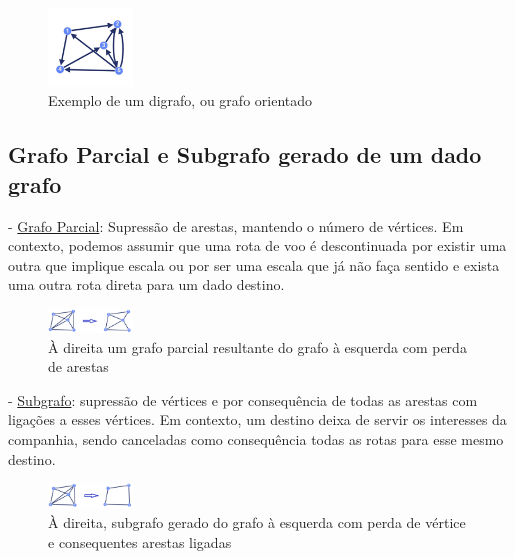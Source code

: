 \begin{figure}[h]
    \centering
    \includegraphics[width=0.2\textwidth]{imgs/Figura5}
    \caption{Exemplo de um digrafo, ou grafo orientado\label{fig:imagem5}}
\end{figure}

\subsection{Grafo Parcial e Subgrafo gerado de um dado grafo}
- \underline{Grafo Parcial}: Supressão de arestas, mantendo o número de vértices. Em contexto, podemos assumir 
que uma rota de voo é descontinuada por existir uma outra que implique escala ou por ser uma escala que já 
não faça sentido e exista uma outra rota direta para um dado destino.\\
\begin{figure}[h]
    \centering
    \includegraphics[width=0.2\textwidth]{imgs/Figura6}
    \caption{ À direita um grafo parcial resultante do grafo à esquerda com perda de arestas\label{fig:imagem6}}
\end{figure}
\linebreak
\indent - \underline{Subgrafo}: supressão de vértices e por consequência de todas as arestas com ligações a esses vértices. 
Em contexto, um destino deixa de servir os interesses da companhia, sendo canceladas como consequência 
todas as rotas para esse mesmo destino.
\linebreak
\begin{figure}[h]
    \centering
    \includegraphics[width=0.2\textwidth]{imgs/Figura7}
    \caption{ À direita, subgrafo gerado do grafo à esquerda com perda de vértice e consequentes arestas ligadas\label{fig:imagem7}}
\end{figure}

